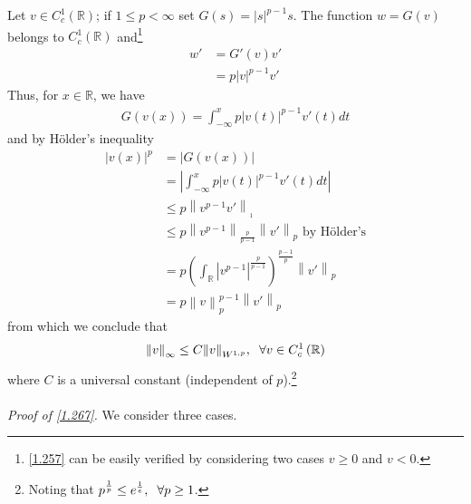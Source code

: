 \documentclass[a4paper,oneside]{article}
\numberwithin{equation}{section}
\begin{document}
Let $v\in C_c^1\left(\mathbb{R}\right)$; if $1\le p <\infty$ set $G\left( s \right) = {\left| s \right|^{p - 1}}s$. The function $w=G\left(v\right)$ belongs to $C_c^1\left(\mathbb{R}\right)$ and\footnote{\eqref{1.257} can be easily verified by considering two cases $v\ge 0$ and $v <0$.}
\begin{align}
w' &= G'\left( v \right)v'\\
 &= p{\left| v \right|^{p - 1}}v' \label{1.257}
\end{align}
Thus, for $x\in \mathbb{R}$, we have
\begin{align}
G\left( {v\left( x \right)} \right) = \int_{ - \infty }^x {p{{\left| {v\left( t \right)} \right|}^{p - 1}}v'\left( t \right)dt} 
\end{align}
and by H\"{o}lder's inequality
\begin{align}
\label{1.259}
{\left| {v\left( x \right)} \right|^p} &= \left| {G\left( {v\left( x \right)} \right)} \right|\\
& = \left| {\int_{ - \infty }^x {p{{\left| {v\left( t \right)} \right|}^{p - 1}}v'\left( t \right)dt} } \right|\\
& \le p{\left\| {{v^{p - 1}}v'} \right\|_{_1}}\\
& \le p{\left\| {{v^{p - 1}}} \right\|_{\frac{p}{{p - 1}}}}{\left\| {v'} \right\|_p}\mbox{ by H\"{o}lder's}\\
& = p{\left( {\int_{\mathbb{R}} {{{\left| {{v^{p - 1}}} \right|}^{\frac{p}{{p - 1}}}}} } \right)^{\frac{{p - 1}}{p}}}{\left\| {v'} \right\|_p}\\
& = p\left\| v \right\|_p^{p - 1}{\left\| {v'} \right\|_p} \label{1.264}
\end{align}
from which we conclude that
\begin{align}
\label{1.267}
{\left\| v \right\|_\infty } \le C{\left\| v \right\|_{{W^{1,p}}}},\hspace{0.2cm}\forall v \in C_c^1\left( \mathbb{R} \right)
\end{align}
where $C$ is a universal constant (independent of $p$).\footnote{Noting that ${p^{\frac{1}{p}}} \le {e^{\frac{1}{e}}},\hspace{0.2cm}\forall p \ge 1$.}\\
\\ 
\textit{Proof of \eqref{1.267}.} We consider three cases.
\end{document}

